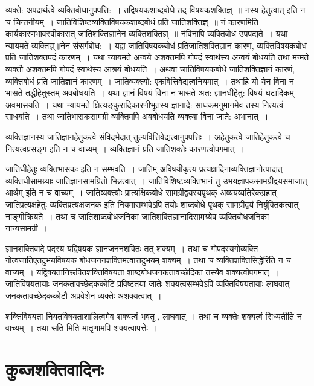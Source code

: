 {व्यक्ते: अपदार्थत्वे व्यक्तिबोधानुपपत्ति:~। तद्विषयकशाब्दबोधे तद् विषयकशक्तिज्ञ्~॥ नस्य हेतुत्वात् इति न च चिन्तनीयम्~। जातिविशिष्टव्यक्तिविषयकशाब्दबोधं प्रति जाति\-शक्तिज्ञ्~॥ नं कारणमिति कार्यकारणभावस्वीकारात् जातिशक्तिज्ञानेन व्यक्तिशक्तिज्ञ्~॥ नं\break विनापि व्यक्तिबोध उपपद्यते~। यथा न्यायमते व्यक्तिज्ञ्॥नेन संसर्गबोध:~। यद्वा जातिविषयकबोधं प्रतिजातिशक्तिज्ञानं कारणं, व्यक्तिविषयकबोधं प्रति जातिशक्तपदं कारणम्~। यथा न्यायमते अन्वये अशक्तमपि गोपदं स्वार्थस्य अन्वयं बोधयति तथा मन्मते व्यक्तौ अशक्तमपि गोपदं स्वार्थस्य आश्रयं बोधयति~। अथवा जातिविषयकबोधे जातिशक्तिज्ञानं कारणं, व्यक्ति\-बोधं प्रति जातिज्ञानं कारणम्~। जातिव्यक्त्यो: एकवित्तिवेद्यत्वनियमात्~। तथाहि यो येन विना न भासते तद्धीहेतुस्तम् अवबोधयति~। यथा ज्ञानं विषयं विना न भासते अत: ज्ञानधीहेतु: विषयं घटादिकम् अवभासयति~। यथा न्यायमते क्षित्यङ्कुरादिकारणीभूतस्य ज्ञानादे: साधक\-मनुमानमेव तस्य नित्यत्वं साधयति~। तथा जातिभासकसामग्री व्यक्तिमपि अवबोधयति व्यक्त्या विना जाते: अभानात्~। 

व्यक्तिज्ञानस्य जातिज्ञानहेतुकत्वे संविद्भेदात् तुल्यवित्तिवेद्यत्वानुपपत्तिः~। अहेतुकत्वे जातिहेतुकत्वे च नित्यत्वप्रसङ्ग इति न च वाच्यम्~। व्यक्तिज्ञानं प्रति जातिशक्तेः कारणत्वोपगमात्~। 

जातिधीहेतुः व्यक्तिभासकः इति न सम्भवति~। जातिम् अविषयीकृत्य प्रत्यक्षादिना\break व्यक्तिज्ञानोत्पादात् व्यक्तिधीसामग्र्याः जातिज्ञानसामग्रितो भिन्नत्वात्~। जातिविशिष्टव्यक्तिभानं तु उभयज्ञापकसामग्रीद्वयसमाजात् आर्थम्  इति न च वाच्यम्~। जातिव्यक्त्योः  प्रात्यक्षिकबोधे सामग्रीद्वयस्यपृथक् अव्ययव्यतिरेकग्रहात् जातिप्रत्यक्षहेतुः व्यक्तिप्रत्यक्षजनक इति नियमासम्भवेऽपि तयोः शाब्दबोधे पृथक् सामग्रीद्वयं निर्युक्तिकत्वात् नाङ्गीक्रियते~। तथा च जातिशाब्दबोधजनिका जातिशक्तिज्ञानादिसामग्र्येव व्यक्तिबोधजनिका नान्यसामग्री~। 

ज्ञानशक्तिवादे पदस्य यद्विषयक ज्ञानजननशक्तिः तत् शक्यम्~। तथा च गोपदस्य\break गोव्यक्ति गोत्वजातिएतदुभयविषयक बोधजननशक्तिमत्वात्तदुभयम् शक्यम्~। तथा च व्यक्ति\-शक्तिसिद्धेरिति न च वाच्यम्~। यद्विषयतानिरूपितशक्तिविषयता शाब्दबोधजनकतावच्छेदिका तस्यैव शक्यत्वोपगमात्~। जातिविषयतायाः जनकतावच्छेदककोटि-प्रविष्टतया \-जातेः शक्यत्वसम्भवेऽपि व्यक्तिविषयतायाः लाघवात् जनकतावच्छेदककोटौ अप्रवेशेन व्यक्तेः \-अशक्यत्वात्~। 

शक्तिविषयता नियतविषयताशालित्वमेव शक्यत्वं भवतु , लाघवात्~। तथा च व्यक्तेः  शक्यत्वं सिध्यतीति न वाच्यम्~। तथा सति मिति-मातृणामपि शक्यत्वापत्तेः~। 

\section*{कुब्जशक्तिवादिनः}

}

